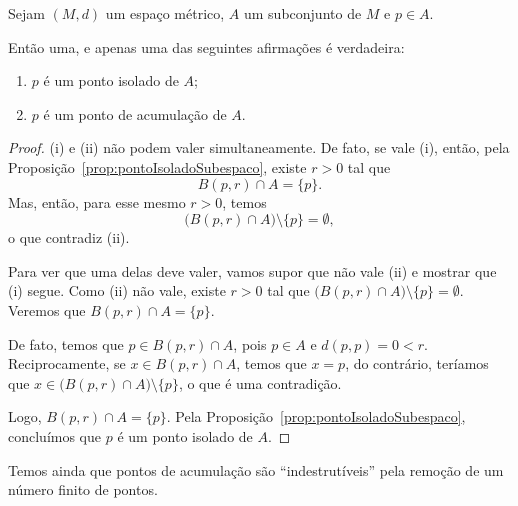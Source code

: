 \begin{proposition}
    Sejam $(M,d)$ um espaço métrico, $A$ um subconjunto de $M$ e $p \in A$.
    
    Então uma, e apenas uma das seguintes afirmações é verdadeira:
    \begin{enumerate}[label=(\roman*)]
        \item $p$ é um ponto isolado de $A$;
        \item $p$ é um ponto de acumulação de $A$.
    \end{enumerate}
\end{proposition}
\begin{proof}
    (i) e (ii) não podem valer simultaneamente.
    De fato, se vale (i), então, pela Proposição~\ref{prop:pontoIsoladoSubespaco}, existe $r>0$ tal que
    \[
        B(p,r)\cap A=\{p\}.
    \]
    Mas, então, para esse mesmo $r>0$, temos
    \[
        \bigl(B(p,r)\cap A\bigr)\setminus\{p\}=\emptyset,
    \]
    o que contradiz (ii).

    Para ver que uma delas deve valer, vamos supor que não vale (ii) e mostrar que (i) segue.
    Como (ii) não vale, existe $r>0$ tal que $\bigl(B(p, r)\cap A\bigr)\setminus\{p\} = \emptyset$.
    Veremos que $B(p, r)\cap A = \{p\}$.

    De fato, temos que $p \in B(p, r)\cap A$, pois $p \in A$ e $d(p, p) = 0 < r$.
    Reciprocamente, se $x \in B(p, r)\cap A$, temos que $x=p$, do contrário, teríamos que $x \in \bigl(B(p, r)\cap A\bigr)\setminus\{p\}$, o que é uma contradição.

    Logo, $B(p,r)\cap A=\{p\}$.
    Pela Proposição~\ref{prop:pontoIsoladoSubespaco}, concluímos que $p$ é um ponto isolado de $A$.
\end{proof}

Temos ainda que pontos de acumulação são ``indestrutíveis'' pela remoção de um número finito de pontos.

